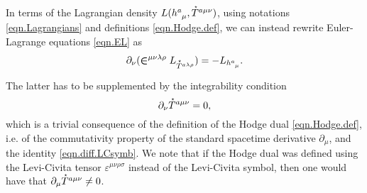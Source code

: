 \documentclass[
10pt, %
a4paper, %
oneside, %
twocolumn,
headinclude,footinclude, %
BCOR5mm, %
]{scrartcl}
\newcommand{\IP}[1]{{\color{Red}[IP:\ \ #1]}}
\newcommand{\tetrsymbol}{h}
\newcommand{\tetr}[2]{\tetrsymbol^{#1}_{\phantom{#1}#2}}
\newcommand{\D}[1]{\partial_{#1}} %
\newcommand{\Laghodge}{L}%
\newcommand{\LCsymb}{\bm{\in}}    %
\newcommand{\LCtens}{\varepsilon} %
\newcommand{\HDT}[1]{\accentset{\star}{T}^{#1}}
\begin{document}
	
	In terms of the Lagrangian density $ \Laghodge(\tetr{a}{\mu},\HDT{a\mu\nu}) 
	$, using notations 
	\eqref{eqn.Lagrangians} and definitions 
	\eqref{eqn.Hodge.def}, we can instead
	rewrite Euler-Lagrange equations \eqref{eqn.EL} as
	\begin{equation}\label{eqn.EM.Hodge}
		\D{\nu}(\LCsymb^{\mu\nu\lambda\rho}\Laghodge_{\HDT{a\lambda\rho}}) 
		=-\Laghodge_{\tetr{a}{\mu}}.
	\end{equation}
	
	The latter has to be supplemented by the integrability 
	condition
	\begin{equation}\label{integr.HT}
		\D{\nu}\HDT{a\mu\nu} = 0,
	\end{equation}
	which is a trivial consequence of the definition of the  Hodge dual \eqref{eqn.Hodge.def}, i.e. 
	of 
	the 
	commutativity property of the standard spacetime derivative $ \D{\mu} $, and the 
	identity \eqref{eqn.diff.LCsymb}.
	We note that if the Hodge dual was defined using the Levi-Civita tensor $ 
	\LCtens^{\mu\nu\rho\sigma} $ instead of the Levi-Civita symbol, then one would 
	have that $ \D{\mu}\HDT{a\mu\nu} \neq 0 $.
	
\end{document}
